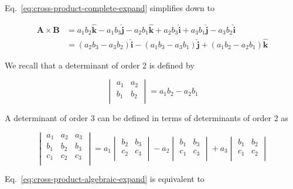 Eq.~\ref{eq:cross-product-complete-expand} simplifies down to

\begin{align}
    \boldsymbol{A} \times \boldsymbol{B} &= a_1 b_2 \boldsymbol{\hat{k}} - a_1 b_3 \boldsymbol{\hat{j}} - a_2 b_1 \boldsymbol{\hat{k}} + a_2 b_3 \boldsymbol{\hat{i}} + a_3 b_1 \boldsymbol{\hat{j}} - a_3 b_2 \boldsymbol{\hat{i}} \\
    &= (a_2 b_3 - a_3 b_2)\boldsymbol{\hat{i}} - (a_1 b_3 - a_3 b_1)\boldsymbol{\hat{j}} + (a_1 b_2 - a_2 b_1)\boldsymbol{\hat{k}}\label{eq:cross-product-algebraic-expand}
\end{align}

We recall that a determinant of order 2 is defined by

\begin{equation}
    \begin{vmatrix}
        a_1 & a_2 \\
        b_1 & b_2 \\
    \end{vmatrix} = a_1 b_2 - a_2 b_1
\end{equation}

A determinant of order 3 can be defined in terms of determinants of order 2 as

\begin{equation}
    \begin{vmatrix}
        a_1 & a_2 & a_3 \\
        b_1 & b_2 & b_3 \\
        c_1 & c_2 & c_3 \\
    \end{vmatrix} =
    a_1 \begin{vmatrix}
        b_2 & b_3 \\
        c_2 & c_3 \\
    \end{vmatrix} -
    a_2 \begin{vmatrix}
        b_1 & b_3 \\
        c_1 & c_3 \\
    \end{vmatrix} +
    a_3 \begin{vmatrix}
        b_1 & b_2 \\
        c_1 & c_2 \\
    \end{vmatrix}
\end{equation}

Eq.~\ref{eq:cross-product-algebraic-expand} is equivalent to

